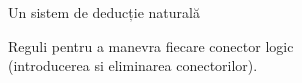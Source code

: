 \documentclass[xcolor=pdftex,romanian,colorlinks]{beamer}
\begin{document}
\begin{frame}{Un sistem de deducție naturală}

Reguli pentru a manevra fiecare conector logic \\(introducerea si eliminarea conectorilor).

\begin{columns}
\begin{column}{0.3\textwidth}
\end{column}
\begin{column}{0.3\textwidth}
\end{column}
\begin{column}{0.3\textwidth}
\end{column}
\end{columns}

\begin{columns}
\begin{column}{0.4\textwidth}
\end{column}
\begin{column}{0.4\textwidth}
\end{column}
\end{columns}


\vspace{-.4cm}
\begin{center}
\end{center}

\end{frame}
\end{document}

